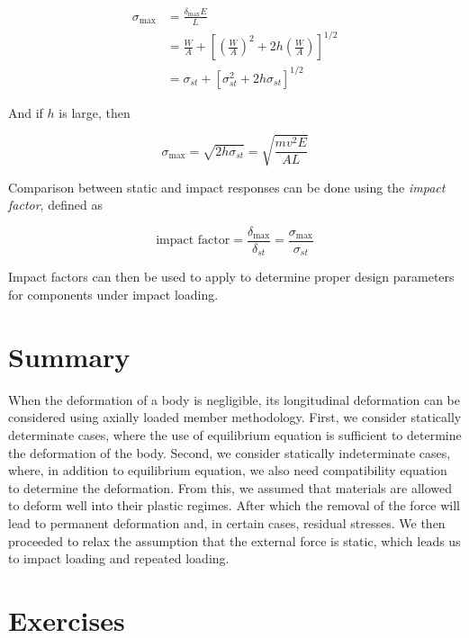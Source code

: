 \documentclass[
10pt,
a4paper,
openany,
svgnames,
]{book} %
\begin{document}
\begin{align}
  \sigma_{\max} &= \frac{\delta_{\max} E}{L} \nonumber \\
                &= \frac{W}{A} + \left[ \left( \frac{W}{A} \right)^2 + 2h \left( \frac{W}{A} \right) \right]^{1/2} \nonumber \\
                &= \sigma_{st} + \left[ \sigma_{st}^2 + 2h \sigma_{st} \right]^{1/2}
\end{align}

And if $h$ is large, then

\begin{equation}
  \sigma_{\max} = \sqrt{ 2h \sigma_{st} } = \sqrt{ \frac{mv^2 E}{AL} }
\end{equation}

Comparison between static and impact responses can be done using the \emph{impact factor}, defined as

\begin{equation}
  \text{impact factor} = \frac{\delta_{\max}}{\delta_{st}} = \frac{\sigma_{\max}}{\sigma_{st}}
\end{equation}

Impact factors can then be used to apply to determine proper design parameters for components under impact loading.

\section*{Summary}

When the deformation of a body is negligible, its longitudinal deformation can be considered using axially loaded member methodology. First, we consider statically determinate cases, where the use of equilibrium equation is sufficient to determine the deformation of the body. Second, we consider statically indeterminate cases, where, in addition to equilibrium equation, we also need compatibility equation to determine the deformation. From this, we assumed that materials are allowed to deform well into their plastic regimes. After which the removal of the force will lead to permanent deformation and, in certain cases, residual stresses. We then proceeded to relax the assumption that the external force is static, which leads us to impact loading and repeated loading.

\section*{Exercises}
\end{document}

